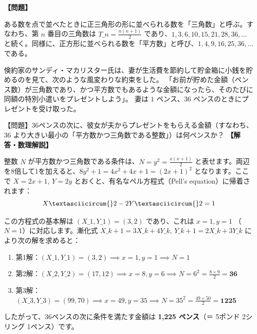\documentclass[10pt,a4paper,oneside,openany]{ltjsbook}
\begin{document}
\begin{tcolorbox}[colback=softblue,colframe=primaryblue,title=\textbf{第 137 問：倹約の研究（三角数と平方数） （原題: A STUDY IN THRIFT.）},arc=2mm,boxrule=1pt,breakable]
\textbf{【問題】}\par\vspace{0.3em}
ある数を点で並べたときに正三角形の形に並べられる数を「三角数」と呼ぶ。すなわち、第 $n$ 番目の三角数は $T\_n = \frac{n(n+1)}{2}$ であり、$1, 3, 6, 10, 15, 21, 28, 36, \dots$ と続く。同様に、正方形に並べられる数を「平方数」と呼び、$1, 4, 9, 16, 25, 36, \dots$ である。

倹約家のサンディ・マカリスター氏は、妻が生活費を節約して貯金箱に小銭を貯めるのを見て、次のような風変わりな約束をした。
「お前が貯めた金額（ペンス数）が三角数であり、かつ平方数でもあるような金額になったら、そのたびに同額の特別小遣いをプレゼントしよう」。
妻は $1$ ペンス、$36$ ペンスのときにプレゼントを受け取った。

【問題】36ペンスの次に、彼女が夫からプレゼントをもらえる金額（すなわち、36 より大きい最小の「平方数かつ三角数である整数」）は何ペンスか？
\tcblower
\textbf{【解答・数理解説】}\par\vspace{0.3em}
整数 $N$ が平方数かつ三角数である条件は、$N = y^2 = \frac{x(x+1)}{2}$ と表せます。両辺を8倍して1を加えると、$8y^2 + 1 = 4x^2 + 4x + 1 = (2x+1)^2$ となります。ここで $X = 2x+1$, $Y = 2y$ とおくと、有名なペル方程式（Pell's equation）に帰着されます：
\[ X\textasciicircum{}2 - 2Y\textasciicircum{}2 = 1 \]

この方程式の基本解は $(X\_1, Y\_1) = (3, 2)$ であり、これは $x=1, y=1$ （$N=1$）に対応します。漸化式 $X\_{k+1} = 3X\_k + 4Y\_k$, $Y\_{k+1} = 2X\_k + 3Y\_k$ により次の解を求めると：
\begin{enumerate}[leftmargin=2em]
\item 第1解：$(X\_1, Y\_1) = (3, 2) \implies x=1, y=1 \implies N = 1$
\item 第2解：$(X\_2, Y\_2) = (17, 12) \implies x=8, y=6 \implies N = 6^2 = \frac{8 \times 9}{2} = \mathbf{36}$
\item 第3解：$(X\_3, Y\_3) = (99, 70) \implies x=49, y=35 \implies N = 35^2 = \frac{49 \times 50}{2} = \mathbf{1225}$
\end{enumerate}
したがって、36ペンスの次に条件を満たす金額は \textbf{1,225 ペンス}（＝ 5ポンド 2シリング 1ペンス）です。
\end{tcolorbox}
\end{document}
